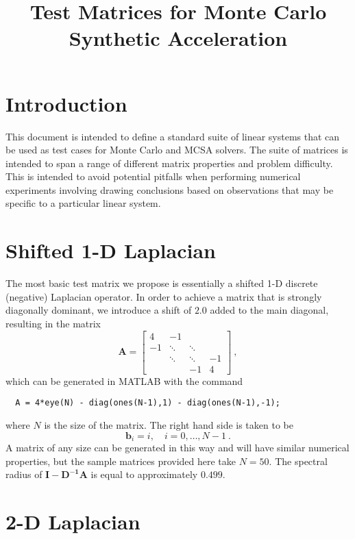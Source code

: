 \documentclass{article}
\title{Test Matrices for Monte Carlo Synthetic Acceleration}
\begin{document}
\maketitle

\section{Introduction}

This document is intended to define a standard suite of linear
systems that can be used as test cases for Monte Carlo and
MCSA solvers.  The suite of matrices is intended to span a 
range of different matrix properties and problem difficulty.
This is intended to avoid potential pitfalls when performing
numerical experiments involving drawing conclusions based on
observations that may be specific to a particular linear system.

\section{Shifted 1-D Laplacian}

The most basic test matrix we propose is essentially a shifted
1-D discrete (negative) Laplacian operator.  In order to achieve a matrix
that is strongly diagonally dominant, we introduce a shift of
$2.0$ added to the main diagonal, resulting in the matrix
\begin{equation}
 \mathbf{A} = \begin{bmatrix} 4 & -1 \\ -1 & \ddots & \ddots \\ 
     & \ddots & \ddots & -1 \\  & & -1 & 4 \end{bmatrix} \:,
\end{equation}
which can be generated in MATLAB with the command
\begin{verbatim}
  A = 4*eye(N) - diag(ones(N-1),1) - diag(ones(N-1),-1);
\end{verbatim}
where $N$ is the size of the matrix.
The right hand side is taken to be
\begin{equation}
 \mathbf{b}_i = i, \quad i=0,\ldots,N-1 \:.
\end{equation}
A matrix of any size can be generated in this way and will have
similar numerical properties, but the sample matrices
provided here take $N=50$.
The spectral radius of $\mathbf{I - D^{-1}A}$ is equal to approximately
$0.499$.

\section{2-D Laplacian}
\end{document}
